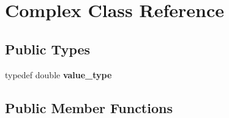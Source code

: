 \hypertarget{classComplex}{}\section{Complex Class Reference}
\label{classComplex}
\subsection*{Public Types}
\begin{DoxyCompactItemize}
\item 
\mbox{\label{classComplex_acc42f0a27ce00262073f8eeaa34d2b33}} 
typedef double {\bfseries value\+\_\+type}
\end{DoxyCompactItemize}
\subsection*{Public Member Functions}
